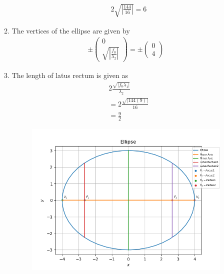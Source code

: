 \documentclass[12pt]{article}
\providecommand{\brak}[1]{\ensuremath{\left(#1\right)}}
\providecommand{\abs}[1]{\left\vert#1\right\vert}
\newcommand{\myvec}[1]{\ensuremath{\begin{pmatrix}#1\end{pmatrix}}}
\begin{document}
\begin{enumerate}
\begin{enumerate}
\begin{align}
        &2\sqrt{\abs{\frac{144}{16}}}= 6
\end{align}
\item The vertices of the ellipse are given by
\begin{align}
 \pm \myvec{0\\\sqrt{\abs{\frac{f_0}{\lambda_2}}}}= \pm \myvec{0\\4}
\end{align}
\item The length of latus rectum is given as
\begin{align}
 &2\frac{\sqrt{\abs{f_0 \lambda_1}}}{\lambda_2} \\
 &= 2\frac{\sqrt{\abs{144\brak{9}}}}{16}\\
 &= \frac{9}{2}
\end{align}
\begin{figure}[!h]
	\begin{center}
		\includegraphics[width=\columnwidth]{figs/conic.png}
	\end{center}
\caption{}
\label{fig:Fig1}
\end{figure}
\end{enumerate}
\end{enumerate}
\end{document}
